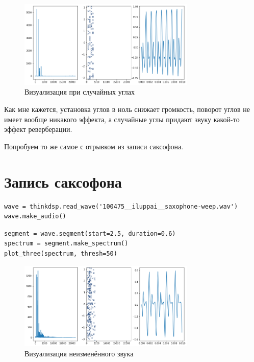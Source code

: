 \documentclass[a4paper,12pt]{report}
\begin{document}
\begin{figure}[H]
        \centering
        \includegraphics[width=0.75\textwidth]{lab6_fig3_12.png}
        \caption{Визуализация при случайных углах}
        \label{fig:lab6_fig3_12}
\end{figure}

Как мне кажется, установка углов в ноль снижает громкость, поворот углов не имеет вообще никакого эффекта, а случайные углы придают звуку какой-то эффект реверберации.

Попробуем то же самое с отрывком из записи саксофона.

\section{Запись саксофона}

\begin{lstlisting}[caption=Загрузка звука]
wave = thinkdsp.read_wave('100475__iluppai__saxophone-weep.wav')
wave.make_audio()
\end{lstlisting}

\begin{lstlisting}[caption=Визуализация неизменённого звука]
segment = wave.segment(start=2.5, duration=0.6)
spectrum = segment.make_spectrum()
plot_three(spectrum, thresh=50)
\end{lstlisting}

\begin{figure}[H]
        \centering
        \includegraphics[width=0.75\textwidth]{lab6_fig3_13.png}
        \caption{Визуализация неизменённого звука}
        \label{fig:lab6_fig3_13}
\end{figure}
\end{document}
